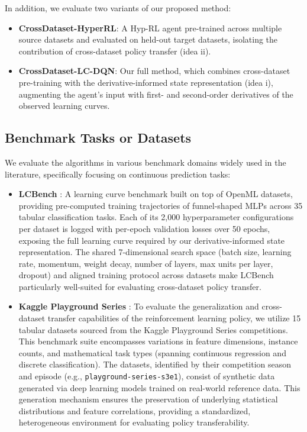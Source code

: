 In addition, we evaluate two variants of our proposed method:
\begin{itemize}
    \item \textbf{CrossDataset-HyperRL}: A Hyp-RL agent pre-trained across multiple 
    source datasets and evaluated on held-out target datasets, isolating the 
    contribution of cross-dataset policy transfer (idea ii).
    \item \textbf{CrossDataset-LC-DQN}: Our full method, which combines cross-dataset 
    pre-training with the derivative-informed state representation (idea i), 
    augmenting the agent's input with first- and second-order derivatives of the 
    observed learning curves.
\end{itemize}

\subsection{Benchmark Tasks or Datasets}
We evaluate the algorithms in various benchmark domains widely used in the literature, specifically focusing on continuous prediction tasks:
\begin{itemize}
    \item \textbf{LCBench} \citep{zimmer2021autopytorch}: A learning curve benchmark built on top of OpenML datasets, providing pre-computed training trajectories of funnel-shaped MLPs across 35 tabular classification tasks. Each of its 2{,}000 hyperparameter configurations per dataset is logged with per-epoch validation losses over 50 epochs, exposing the full learning curve required by our derivative-informed state representation. The shared 7-dimensional search space (batch size, learning rate, momentum, weight decay, number of layers, max units per layer, dropout) and aligned training protocol across datasets make LCBench particularly well-suited for evaluating cross-dataset policy transfer.
    \item \textbf{Kaggle Playground Series} \citep{kaggle_playground}: To evaluate the generalization and cross-dataset transfer capabilities of the reinforcement learning policy, we utilize 15 tabular datasets sourced from the Kaggle Playground Series competitions. This benchmark suite encompasses variations in feature dimensions, instance counts, and mathematical task types (spanning continuous regression and discrete classification). The datasets, identified by their competition season and episode (e.g., \texttt{playground-series-s3e1}), consist of synthetic data generated via deep learning models trained on real-world reference data. This generation mechanism ensures the preservation of underlying statistical distributions and feature correlations, providing a standardized, heterogeneous environment for evaluating policy transferability.
\end{itemize}

% 
% 